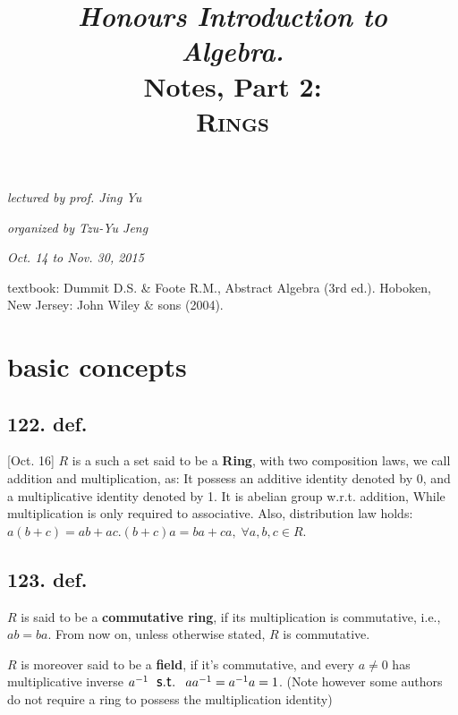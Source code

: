 \documentclass[12pt]{article}
\newcommand\Ev\forall%
\newcommand\St{\textsf{\large \: s.t. \:}}%
\newcommand{\Ss}[1]{\textsf{\bfseries{#1}}}%
\begin{document}
\title{
 \textit{Honours Introduction to} \\
 \textit{\textbf{\Huge Algebra.}} \\
 Notes, Part 2: \\
 \huge\textsc{Rings}
}
\date{}
\author{}
\maketitle
\allowdisplaybreaks[4]%

\vspace{-3.3cm} %
\hfill{\itshape lectured by prof. Jing Yu} \par
\hfill{\itshape organized by Tzu-Yu Jeng} \par
\hfill{\itshape Oct. 14 to Nov. 30, 2015} \\
\vspace{-0.2cm} 

textbook: Dummit D.S. \& Foote R.M., Abstract Algebra (3rd ed.). Hoboken, New Jersey: John Wiley \& sons (2004). \par
[Herstein I.N., Topic in Algebra (2nd ed.). Hoboken, New Jersey: John Wiley \& sons (2004).] \par
[Fraleigh J.B., A First Course in Abstract Algebra (7th ed.). Boston, Massachusetts: Addison-Wesley (2003).]

\setcounter{section}{13}
\section{basic concepts}
\subsection*{122. def.} [Oct. 16] \(R\) is a such a set said to be a \Ss{Ring}, with two composition laws, we call addition and multiplication, as: 
It possess an additive identity denoted by 0, and a multiplicative identity denoted by 1. 
It is abelian group w.r.t. addition, 
While multiplication is only required to associative. 
Also, distribution law holds: \(a(b+c) = ab+ac. (b+c)a = ba+ca,\; \Ev a,b,c \in R\). 

\subsection*{123. def.} \(R\) is said to be a \Ss{commutative ring}, if its multiplication is commutative, i.e., \(ab=ba\). 
From now on, unless otherwise stated, \(R\) is commutative. \par
\(R\) is moreover said to be a \Ss{field}, if it's commutative, and every \(a \neq 0\) has multiplicative inverse \(a^{-1} \St aa^{-1} = a^{-1}a = 1\). 
(Note however some authors do not require a ring to possess the multiplication identity)
\end{document}
